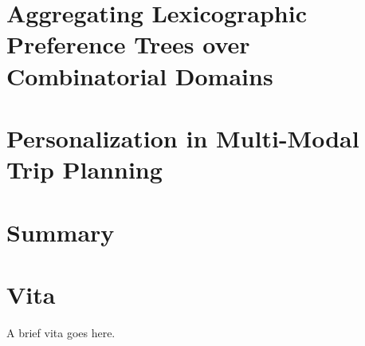 \documentclass[final]{ukthesis}
\begin{document}
\chapter{Aggregating Lexicographic Preference Trees over Combinatorial Domains\label{ch:aggLP}}

\copyrightnotice

\chapter{Personalization in Multi-Modal Trip Planning\label{ch:trip}}

\copyrightnotice

\chapter{Summary\label{ch:summary}}

\copyrightnotice


\backmatter



\chapter{Vita}
A brief vita goes here.
\end{document}
